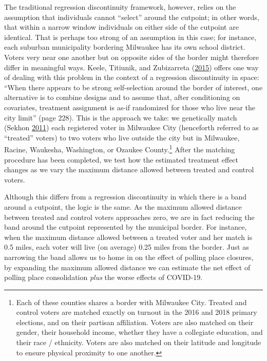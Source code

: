 \documentclass[
  12pt,
]{article}
\begin{document}
The traditional regression discontinuity framework, however, relies on the assumption that individuals cannot ``select'' around the cutpoint; in other words, that within a narrow window individuals on either side of the cutpoint are identical. That is perhaps too strong of an assumption in this case; for instance, each suburban municipality bordering Milwaukee has its own school district. Voters very near one another but on opposite sides of the border might therefore differ in meaningful ways. Keele, Titiunik, and Zubizarreta (\protect\hyperlink{ref-Keele2015}{2015}) offers one way of dealing with this problem in the context of a regression discontinuity in space: ``When there appears to be strong self-selection around the border of interest, one alternative is to combine designs and to assume that, after conditioning on covariates, treatment assignment is as-if randomized for those who live near the city limit'' (page 228). This is the approach we take: we genetically match (Sekhon \protect\hyperlink{ref-Sekhon2011}{2011}) each registered voter in Milwaukee City (henceforth referred to as ``treated'' voters) to two voters who live outside the city but in Milwaukee, Racine, Waukesha, Washington, or Ozaukee County.\footnote{Each of these counties shares a border with Milwaukee City. Treated and control voters are matched exactly on turnout in the 2016 and 2018 primary elections, and on their partisan affiliation. Voters are also matched on their gender, their household income, whether they have a collegiate education, and their race / ethnicity. Voters are also matched on their latitude and longitude to ensure physical proximity to one another.} After the matching procedure has been completed, we test how the estimated treatment effect changes as we vary the maximum distance allowed between treated and control voters.

Although this differs from a regression discontinuity in which there is a band around a cutpoint, the logic is the same. As the maximum allowed distance between treated and control voters approaches zero, we are in fact reducing the band around the cutpoint represented by the municipal border. For instance, when the maximum distance allowed between a treated voter and her match is 0.5 miles, each voter will live (on average) 0.25 miles from the border. Just as narrowing the band allows us to home in on the effect of polling place closures, by expanding the maximum allowed distance we can estimate the net effect of polling place consolidation \emph{plus} the worse effects of COVID-19.
\end{document}
